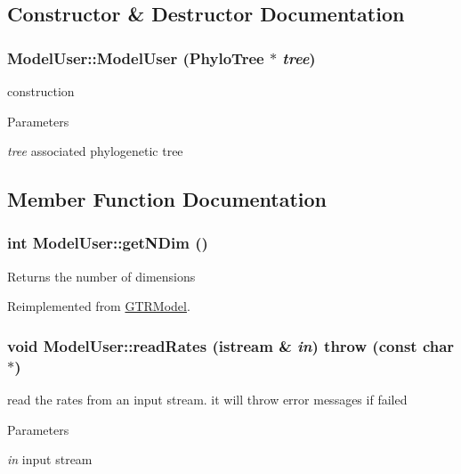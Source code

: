 \subsection{Constructor \& Destructor Documentation}
\hypertarget{classModelUser_a69fd20f8460e71c0d2e3f7b0daf015c3}{
\subsubsection[{ModelUser}]{\setlength{\rightskip}{0pt plus 5cm}ModelUser::ModelUser ({\bf PhyloTree} $\ast$ {\em tree})}}
\label{classModelUser_a69fd20f8460e71c0d2e3f7b0daf015c3}
construction 
\begin{DoxyParams}{Parameters}
\item[{\em tree}]associated phylogenetic tree \end{DoxyParams}


\subsection{Member Function Documentation}
\hypertarget{classModelUser_ad5a88a6c25475b8bb0ea778f4c40cf3b}{
\subsubsection[{getNDim}]{\setlength{\rightskip}{0pt plus 5cm}int ModelUser::getNDim ()}}
\label{classModelUser_ad5a88a6c25475b8bb0ea778f4c40cf3b}
\begin{DoxyReturn}{Returns}
the number of dimensions 
\end{DoxyReturn}


Reimplemented from \hyperlink{classGTRModel_a6e2066898fbbb245596d4a97dd8ee33c}{GTRModel}.\hypertarget{classModelUser_ae0aedeb30d43fbcffcaf5da4bbef5c06}{
\subsubsection[{readRates}]{\setlength{\rightskip}{0pt plus 5cm}void ModelUser::readRates (istream \& {\em in})  throw (const char$\ast$)}}
\label{classModelUser_ae0aedeb30d43fbcffcaf5da4bbef5c06}
read the rates from an input stream. it will throw error messages if failed 
\begin{DoxyParams}{Parameters}
\item[{\em in}]input stream \end{DoxyParams}



